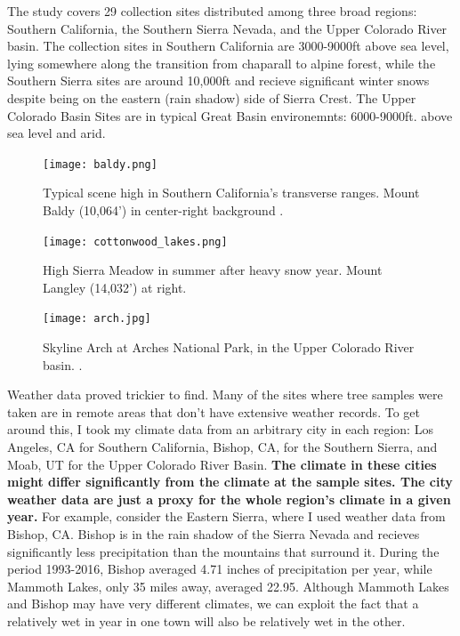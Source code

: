 \documentclass[]{article}
\begin{document}
The study covers 29 collection sites distributed among three broad regions: Southern California, the Southern Sierra Nevada, and the Upper Colorado River basin. The collection sites in Southern California are 3000-9000ft above sea level, lying somewhere along the transition from chaparall to alpine forest, while the Southern Sierra sites are around 10,000ft and recieve significant winter snows despite being on the eastern (rain shadow) side of Sierra Crest. The Upper Colorado Basin Sites are in typical Great Basin environemnts: 6000-9000ft. above sea level and arid. 

\begin{figure}
	\centering
	\texttt{[image: baldy.png]}
	\caption{Typical scene high in Southern California's transverse ranges. Mount Baldy (10,064') in center-right background \cite{me}.}
	\label{fig:baldy}
\end{figure}

\begin{figure}
	\centering
	\texttt{[image: cottonwood\_lakes.png]}
	\caption{High Sierra Meadow in summer after heavy snow year. Mount Langley (14,032') at right\cite{me}.}
	\label{fig:cottonwood}
\end{figure}

\begin{figure}
	\centering
	\texttt{[image: arch.jpg]}
	\caption{Skyline Arch at Arches National Park, in the Upper Colorado River basin. \cite{arch_pic}.}
	\label{fig:arch}
\end{figure}

Weather data proved trickier to find. Many of the sites where tree samples were taken are in remote areas that don't have extensive weather records. To get around this, I took my climate data from an arbitrary city in each region: Los Angeles, CA for Southern California, Bishop, CA, for the Southern Sierra, and Moab, UT for the Upper Colorado River Basin. \textbf{The climate in these cities might differ significantly from the climate at the sample sites.  The city weather data are just a proxy for the whole region's climate in a given year.} For example, consider the Eastern Sierra, where I used weather data from Bishop, CA. Bishop is in the rain shadow of the Sierra Nevada and recieves significantly less precipitation than  the mountains that surround it. During the period 1993-2016, Bishop averaged 4.71 inches of precipitation per year,  while Mammoth Lakes, only 35 miles away, averaged 22.95. Although Mammoth Lakes and Bishop may have very different climates, we can exploit the fact that a relatively wet in year in one town will also be relatively wet in the other. 
\end{document}
